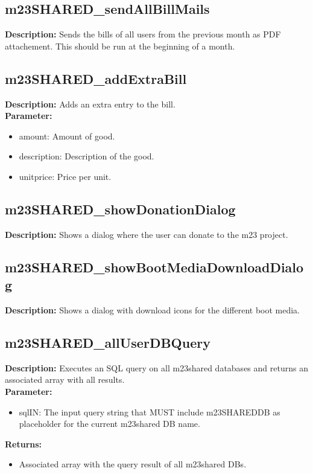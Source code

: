 \subsection{m23SHARED\_sendAllBillMails}
\textbf{Description:} Sends the bills of all users from the previous month as PDF attachement. This should be run at the beginning of a month.\\

\subsection{m23SHARED\_addExtraBill}
\textbf{Description:} Adds an extra entry to the bill.\\
\textbf{Parameter:}
\begin{itemize}
\item amount: Amount of good.
\item description: Description of the good.
\item unitprice: Price per unit.
\end{itemize}

\subsection{m23SHARED\_showDonationDialog}
\textbf{Description:} Shows a dialog where the user can donate to the m23 project.\\

\subsection{m23SHARED\_showBootMediaDownloadDialog}
\textbf{Description:} Shows a dialog with download icons for the different boot media.\\

\subsection{m23SHARED\_allUserDBQuery}
\textbf{Description:} Executes an SQL query on all m23shared databases and returns an associated array with all results.\\
\textbf{Parameter:}
\begin{itemize}
\item sqlIN: The input query string that MUST include m23SHAREDDB as placeholder for the current m23shared DB name.
\end{itemize}
\textbf{Returns:}
\begin{itemize}
\item Associated array with the query result of all m23shared DBs.
\end{itemize}

